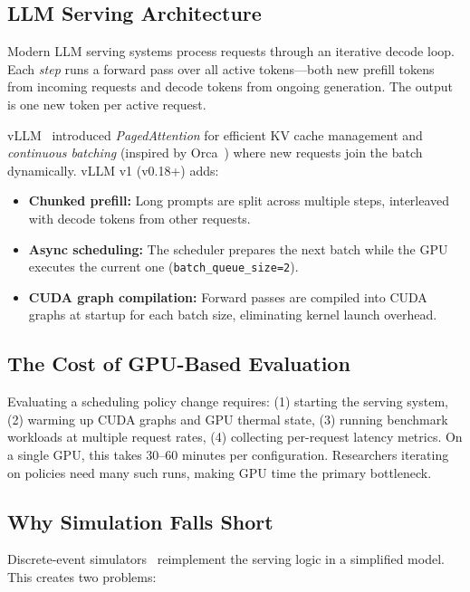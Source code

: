 \documentclass[conference]{IEEEtran}
\begin{document}
\subsection{LLM Serving Architecture}

Modern LLM serving systems process requests through an iterative decode loop. Each \emph{step} runs a forward pass over all active tokens---both new prefill tokens from incoming requests and decode tokens from ongoing generation. The output is one new token per active request.

vLLM~\cite{kwon2023vllm} introduced \emph{PagedAttention} for efficient KV cache management and \emph{continuous batching} (inspired by Orca~\cite{yu2022orca}) where new requests join the batch dynamically. vLLM v1 (v0.18+) adds:

\begin{itemize}
\item \textbf{Chunked prefill:} Long prompts are split across multiple steps, interleaved with decode tokens from other requests.
\item \textbf{Async scheduling:} The scheduler prepares the next batch while the GPU executes the current one (\texttt{batch\_queue\_size=2}).
\item \textbf{CUDA graph compilation:} Forward passes are compiled into CUDA graphs at startup for each batch size, eliminating kernel launch overhead.
\end{itemize}

\subsection{The Cost of GPU-Based Evaluation}

Evaluating a scheduling policy change requires:
(1) starting the serving system,
(2) warming up CUDA graphs and GPU thermal state,
(3) running benchmark workloads at multiple request rates,
(4) collecting per-request latency metrics.
On a single GPU, this takes 30--60 minutes per configuration. Researchers iterating on policies need many such runs, making GPU time the primary bottleneck.

\subsection{Why Simulation Falls Short}

Discrete-event simulators~\cite{agrawal2024vidur} reimplement the serving logic in a simplified model. This creates two problems:
\end{document}
